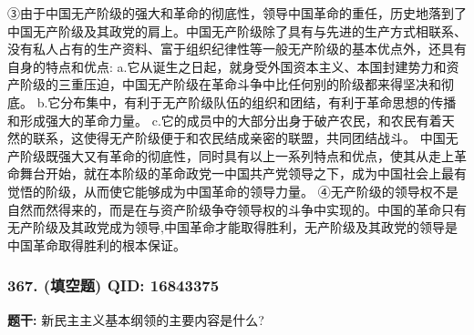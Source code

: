 \documentclass[12pt,UTF8]{ctexart}
\begin{document}
③由于中国无产阶级的强大和革命的彻底性，领导中国革命的重任，历史地落到了中国无产阶级及其政党的肩上。中国无产阶级除了具有与先进的生产方式相联系、没有私人占有的生产资料、富于组织纪律性等一般无产阶级的基本优点外，还具有自身的特点和优点:
a.它从诞生之日起，就身受外国资本主义、本国封建势力和资产阶级的三重压迫，中国无产阶级在革命斗争中比任何别的阶级都来得坚决和彻底。
b.它分布集中，有利于无产阶级队伍的组织和团结，有利于革命思想的传播和形成强大的革命力量。
c.它的成员中的大部分出身于破产农民，和农民有着天然的联系，这使得无产阶级便于和农民结成亲密的联盟，共同团结战斗。
中国无产阶级既强大又有革命的彻底性，同时具有以上一系列特点和优点，使其从走上革命舞台开始，就在本阶级的革命政党一中国共产党领导之下，成为中国社会上最有觉悟的阶级，从而使它能够成为中国革命的领导力量。
④无产阶级的领导权不是自然而然得来的，而是在与资产阶级争夺领导权的斗争中实现的。中国的革命只有无产阶级及其政党成为领导,中国革命才能取得胜利，无产阶级及其政党的领导是中国革命取得胜利的根本保证。

\vspace{0.3em}\hrulefill\vspace{0.7em}

\subsubsection*{367. (填空题) \small QID: 16843375}

\textbf{题干:}
新民主主义基本纲领的主要内容是什么?
\end{document}
